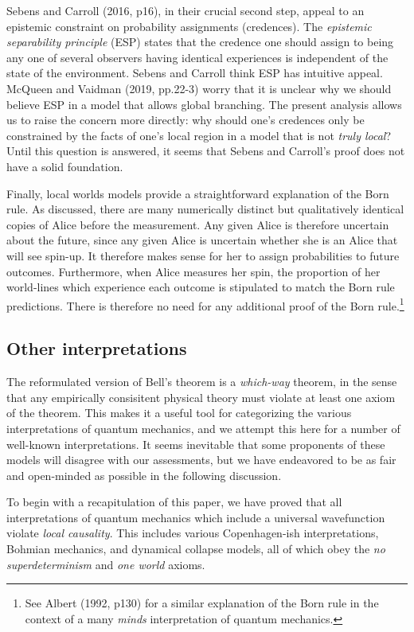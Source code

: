 \documentclass[a4paper]{article}
\begin{document}
Sebens and Carroll (2016, p16), in their crucial second step, appeal to an epistemic constraint on probability assignments (credences). The \textit{epistemic separability principle} (ESP) states that the credence one should assign to being any one of several observers having identical experiences is independent of the state of the environment. Sebens and Carroll think ESP has intuitive appeal. McQueen and Vaidman (2019, pp.22-3) worry that it is unclear why we should believe ESP in a model that allows global branching. The present analysis allows us to raise the concern more directly: why should one's credences only be constrained by the facts of one's local region in a model that is not \textit{truly local}? Until this question is answered, it seems that Sebens and Carroll's proof does not have a solid foundation. 

Finally, local worlds models provide a straightforward explanation of the Born rule. As discussed, there are many numerically distinct but qualitatively identical copies of Alice before the measurement. Any given Alice is therefore uncertain about the future, since any given Alice is uncertain whether she is an Alice that will see spin-up. It therefore makes sense for her to assign probabilities to future outcomes. Furthermore, when Alice measures her spin, the proportion of her world-lines which experience each outcome is stipulated to match the Born rule predictions. There is therefore no need for any additional proof of the Born rule.\footnote{See Albert (1992, p130) for a similar explanation of the Born rule in the context of a many \textit{minds} interpretation of quantum mechanics.}



\subsection{Other interpretations}   \label{Interps}

The reformulated version of Bell's theorem is a \textit{which-way} theorem, in the sense that any empirically consisitent physical theory must violate at least one axiom of the theorem. This makes it a useful tool for categorizing the various interpretations of quantum mechanics, and we attempt this here for a number of well-known interpretations. It seems inevitable that some proponents of these models will disagree with our assessments, but we have endeavored to be as fair and open-minded as possible in the following discussion.

To begin with a recapitulation of this paper, we have proved that all interpretations of quantum mechanics which include a universal wavefunction violate \textit{local causality}.  This includes various Copenhagen-ish interpretations, Bohmian mechanics, and dynamical collapse models, all of which obey the \textit{no superdeterminism} and \textit{one world} axioms.
\end{document}
